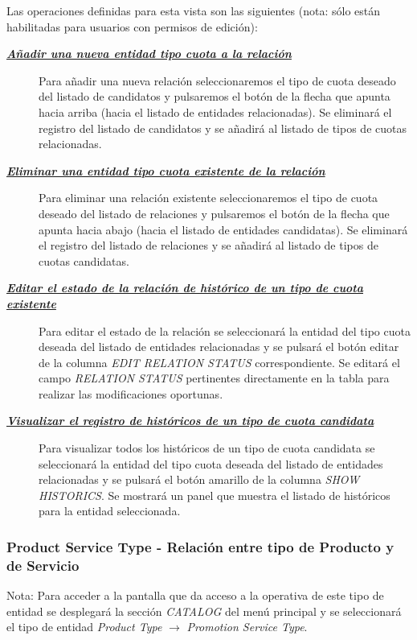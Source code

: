Las operaciones definidas para esta vista son las siguientes (nota: sólo están habilitadas para usuarios con permisos de edición):
\begin{description}
\item[\underline{\textsl{\textbf{Añadir una nueva entidad tipo cuota a la relación}}}] Para añadir una nueva relación seleccionaremos el tipo de cuota deseado del listado de candidatos y pulsaremos el botón de la flecha que apunta hacia arriba (hacia el listado de entidades relacionadas). Se eliminará el registro del listado de candidatos y se añadirá al listado de tipos de cuotas relacionadas.

\item[\underline{\textsl{\textbf{Eliminar una entidad tipo cuota existente de la relación}}}] Para eliminar una relación existente seleccionaremos el tipo de cuota deseado del listado de relaciones y pulsaremos el botón de la flecha que apunta hacia abajo (hacia el listado de entidades candidatas). Se eliminará el registro del listado de relaciones y se añadirá al listado de tipos de cuotas candidatas.

\item[\underline{\textsl{\textbf{Editar el estado de la relación de histórico de un tipo de cuota existente}}}] Para editar el estado de la relación se seleccionará la entidad del tipo cuota deseada del listado de entidades relacionadas y se pulsará el botón editar de la columna \textit{EDIT RELATION STATUS} correspondiente. Se editará el campo \emph{RELATION STATUS}  pertinentes directamente en la tabla para realizar las modificaciones oportunas.

\item[\underline{\textsl{\textbf{Visualizar el registro de históricos de un tipo de cuota candidata}}}] Para visualizar todos los históricos de un tipo de cuota candidata se seleccionará la entidad del tipo cuota deseada del listado de entidades relacionadas y se pulsará el botón amarillo de la columna \textit{SHOW HISTORICS}. Se mostrará un panel que muestra el listado de históricos para la entidad seleccionada.
\end{description}


\subsubsection{Product Service Type - Relación entre tipo de Producto y de Servicio}
\label{sub:product-service-type-relation}

Nota: Para acceder a la pantalla que da acceso a la operativa de este tipo de entidad se desplegará la sección \emph{CATALOG} del menú principal y se seleccionará el tipo de entidad \emph{Product Type} $\rightarrow$  \emph{Promotion Service Type}.


